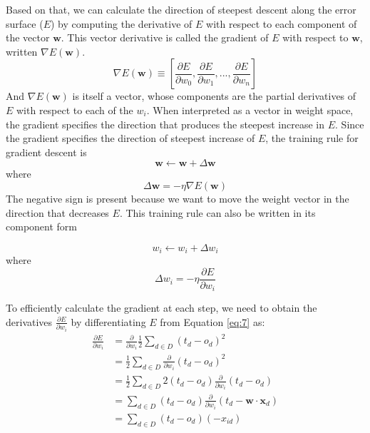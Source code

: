 \documentclass{tufte-handout}
\begin{document}
Based on that, we can calculate the direction of steepest descent along the error surface ($E$) by computing the derivative of $E$ with respect to each component of the vector $\mathbf{w}$. This vector derivative is called the gradient of $E$ with respect to $\mathbf{w}$, written $\nabla E(\mathbf{w})$.
\begin{equation}
    \nabla E(\mathbf{w}) \equiv 
    \left[ \frac{\partial E}{\partial w_0}, \frac{\partial E}{\partial w_1}, ..., \frac{\partial E}{\partial w_n} \right]
\end{equation}
And $\nabla E(\mathbf{w})$ is itself a vector, whose components are the partial derivatives of $E$ with respect to each of the $w_i$. When interpreted as a vector in weight space, the gradient specifies the direction that produces the steepest increase in $E$.
Since the gradient specifies the direction of steepest increase of $E$, the training rule for gradient descent is 
\begin{equation}
    \mathbf{w} \leftarrow \mathbf{w} + \Delta \mathbf{w}
\end{equation}
where
\begin{equation}
    \Delta \mathbf{w} = - \eta \nabla E(\mathbf{w})
\end{equation}
The negative sign is present because we want to move the weight vector in the direction that decreases $E$. This training rule can also be written in its component form

\begin{equation}
    w_i \leftarrow w_i + \Delta w_i
\end{equation}
where
\begin{equation}
    \Delta w_i = -\eta\frac{\partial E}{\partial w_i}
\end{equation}

To efficiently calculate the gradient at each step, we need to obtain the derivatives $\frac{\partial E}{\partial w_i}$ by differentiating $E$ from Equation \ref{eq:7} as:
\begin{equation}
    \begin{split}
        \frac{\partial E}{\partial w_i} &= \frac{\partial}{\partial w_i} \frac{1}{2} \sum_{d \in D} (t_d - o_d)^2 \\
        &= \frac{1}{2} \sum_{d \in D} \frac{\partial}{\partial w_i} (t_d - o_d)^2 \\
        &= \frac{1}{2} \sum_{d \in D} 2 (t_d - o_d) \frac{\partial}{\partial w_i} (t_d - o_d) \\
        &= \sum_{d \in D} (t_d - o_d) \frac{\partial}{\partial w_i} (t_d - \mathbf{w} \cdot \mathbf{x}_d) \\
        &= \sum_{d \in D} (t_d - o_d)(-x_{id})
    \end{split}
\end{equation}
\end{document}
